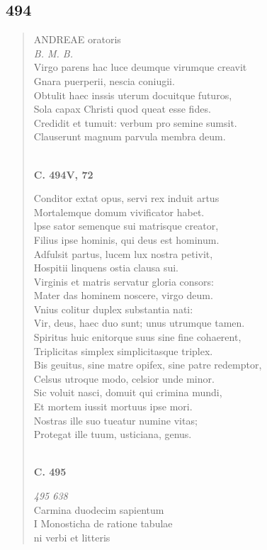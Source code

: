 \documentclass[11pt, a4paper]{report}
\begin{document}
            \subsection*{494}
      \begin{verse}
      ANDREAE oratoris \\ \textit{B. M. B.} \\ Virgo parens hac luce deumque virumque creavit \\ Gnara puerperii, nescia coniugii. \\ Obtulit haec inssis uterum docuitque futuros, \\ Sola capax Christi quod queat esse fides. \\ Credidit et tumuit: verbum pro semine sumsit. \\ Clauserunt magnum parvula membra deum. \\ 
        ﻿\pagebreak 
     \marginpar{[58]} \begin{center} \textbf{C. 494V, 72} \end{center}Conditor extat opus, servi rex induit artus \\ Mortalemque domum vivificator habet. \\ lpse sator semenque sui matrisque creator, \\ Filius ipse hominis, qui deus est hominum. \\ Adfulsit partus, lucem lux nostra petivit, \\ Hospitii linquens ostia clausa sui. \\ Virginis et matris servatur gloria consors: \\ Mater das hominem noscere, virgo deum. \\ Vnius colitur duplex substantia nati: \\ Vir, deus, haec duo sunt; unus utrumque tamen. \\ Spiritus huic enitorque suus sine fine cohaerent, \\ Triplicitas simplex simplicitasque triplex. \\ Bis geuitus, sine matre opifex, sine patre redemptor, \\ Celsus utroque modo, celsior unde minor. \\ Sic voluit nasci, domuit qui crimina mundi, \\ Et mortem iussit mortuus ipse mori. \\ Nostras ille suo tueatur numine vitas; \\ Protegat ille tuum, usticiana, genus. \\ 
        ﻿\pagebreak 
    \begin{center} \textbf{C. 495} \end{center} \marginpar{[59]} \textit{495 638} \\ Carmina duodecim sapientum \\ I Monosticha de ratione tabulae \\ ni verbi et litteris \\ 
      \end{verse}
  
\end{document}
